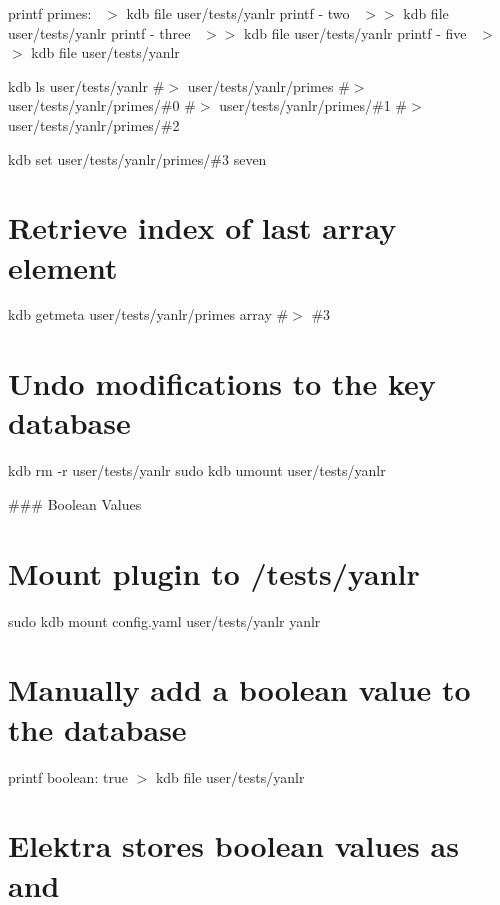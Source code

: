 printf \textquotesingle{}primes\+:~\newline
\textquotesingle{} $>$ {\ttfamily kdb file user/tests/yanlr} printf \textquotesingle{} -\/ two~\newline
\textquotesingle{} $>$$>$ {\ttfamily kdb file user/tests/yanlr} printf \textquotesingle{} -\/ three~\newline
\textquotesingle{} $>$$>$ {\ttfamily kdb file user/tests/yanlr} printf \textquotesingle{} -\/ five~\newline
\textquotesingle{} $>$$>$ {\ttfamily kdb file user/tests/yanlr}

kdb ls user/tests/yanlr \#$>$ user/tests/yanlr/primes \#$>$ user/tests/yanlr/primes/\#0 \#$>$ user/tests/yanlr/primes/\#1 \#$>$ user/tests/yanlr/primes/\#2

kdb set user/tests/yanlr/primes/\#3 seven

\section*{Retrieve index of last array element}

kdb getmeta user/tests/yanlr/primes array \#$>$ \#3

\section*{Undo modifications to the key database}

kdb rm -\/r user/tests/yanlr sudo kdb umount user/tests/yanlr 
\begin{DoxyCode}
### Boolean Values
\end{DoxyCode}
 \section*{Mount plugin to {\ttfamily /tests/yanlr}}

sudo kdb mount config.\+yaml user/tests/yanlr yanlr

\section*{Manually add a boolean value to the database}

printf \textquotesingle{}boolean\+: true\textquotesingle{} $>$ {\ttfamily kdb file user/tests/yanlr}

\section*{Elektra stores boolean values as {} and {}}

